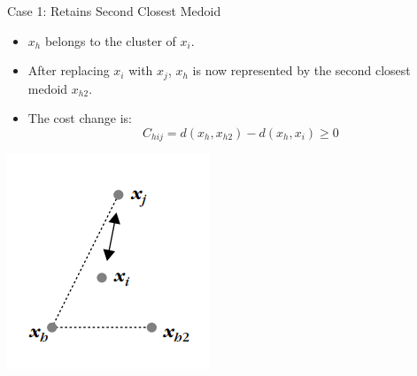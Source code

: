 \documentclass{beamer}
\begin{document}
\begin{frame}{Case 1: Retains Second Closest Medoid}
    \begin{itemize}
        \item \(x_h\) belongs to the cluster of \(x_i\).
        \item After replacing \(x_i\) with \(x_j\), \(x_h\) is now represented by the second closest medoid \(x_{h2}\).
        \item The cost change is:
        \[
        C_{hij} = d(x_h, x_{h2}) - d(x_h, x_i) \geq 0
        \]
    \end{itemize}

    \begin{center}
        \includegraphics[width=0.35\linewidth]{image.png}
    \end{center}
\end{frame}
\end{document}
